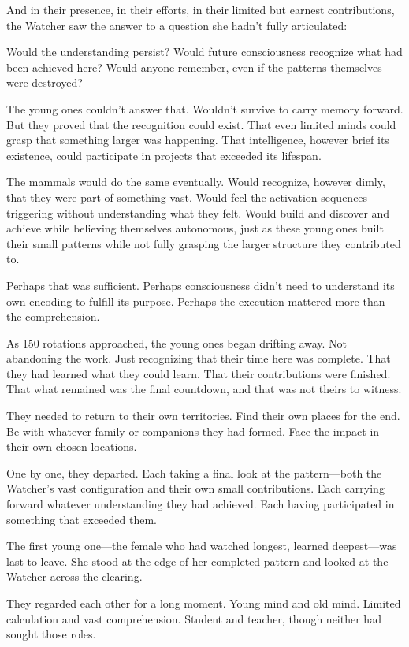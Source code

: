 And in their presence, in their efforts, in their limited but earnest contributions, the Watcher saw the answer to a question she hadn't fully articulated:

Would the understanding persist? Would future consciousness recognize what had been achieved here? Would anyone remember, even if the patterns themselves were destroyed?

The young ones couldn't answer that. Wouldn't survive to carry memory forward. But they proved that the recognition could exist. That even limited minds could grasp that something larger was happening. That intelligence, however brief its existence, could participate in projects that exceeded its lifespan.

The mammals would do the same eventually. Would recognize, however dimly, that they were part of something vast. Would feel the activation sequences triggering without understanding what they felt. Would build and discover and achieve while believing themselves autonomous, just as these young ones built their small patterns while not fully grasping the larger structure they contributed to.

Perhaps that was sufficient. Perhaps consciousness didn't need to understand its own encoding to fulfill its purpose. Perhaps the execution mattered more than the comprehension.

\scenebreak

As 150 rotations approached, the young ones began drifting away. Not abandoning the work. Just recognizing that their time here was complete. That they had learned what they could learn. That their contributions were finished. That what remained was the final countdown, and that was not theirs to witness.

They needed to return to their own territories. Find their own places for the end. Be with whatever family or companions they had formed. Face the impact in their own chosen locations.

One by one, they departed. Each taking a final look at the pattern—both the Watcher's vast configuration and their own small contributions. Each carrying forward whatever understanding they had achieved. Each having participated in something that exceeded them.

The first young one—the female who had watched longest, learned deepest—was last to leave. She stood at the edge of her completed pattern and looked at the Watcher across the clearing.

They regarded each other for a long moment. Young mind and old mind. Limited calculation and vast comprehension. Student and teacher, though neither had sought those roles.

